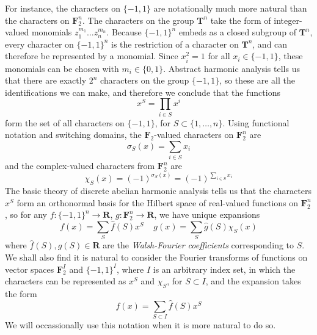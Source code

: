 For instance, the characters on $\{ -1, 1 \}$ are notationally much more natural than the characters on $\mathbf{F}_2^n$. The characters on the group $\mathbf{T}^n$ take the form of integer-valued monomials $z_1^{m_1} \dots z_n^{m_n}$. Because $\{ -1, 1 \}^n$ embeds as a closed subgroup of $\mathbf{T}^n$, every character on $\{ -1, 1 \}^n$ is the restriction of a character on $\mathbf{T}^n$, and can therefore be represented by a monomial. Since $x_i^2 = 1$ for all $x_i \in \{ -1, 1 \}$, these monomials can be chosen with $m_i \in \{ 0, 1 \}$. Abstract harmonic analysis tells us that there are exactly $2^n$ characters on the group $\{ -1, 1 \}$, so these are all the identifications we can make, and therefore we conclude that the functions
%
\[ x^S = \prod_{i \in S} x^i \]
%
form the set of all characters on $\{ -1, 1 \}$, for $S \subset \{ 1, \dots, n \}$. Using functional notation and switching domains, the $\mathbf{F}_2$-valued characters on $\mathbf{F}_2^n$ are
%
\[ \sigma_S(x) = \sum_{i \in S} x_i \]
%
and the complex-valued characters from $\mathbf{F}_2^n$ are
%
\[ \chi_S(x) = (-1)^{\sigma_S(x)} = (-1)^{\sum_{i \in S} x_i} \]
%
The basic theory of discrete abelian harmonic analysis tells us that the characters $x^S$ form an orthonormal basis for the Hilbert space of real-valued functions on $\mathbf{F}_2^n$, so for any $f: \{ -1, 1 \}^n \to \mathbf{R}$, $g: \mathbf{F}_2^n \to \mathbf{R}$, we have unique expansions
%
\[ f(x) = \sum_S \widehat{f}(S) x^S\ \ \ \ \ g(x) = \sum_S \widehat{g}(S) \chi_S(x) \]
%
where $\widehat{f}(S), \widehat{g}(S) \in \mathbf{R}$ are the {\it Walsh-Fourier coefficients} corresponding to $S$. We shall also find it is natural to consider the Fourier transforms of functions on vector spaces $\mathbf{F}_2^I$ and $\{ -1, 1 \}^I$, where $I$ is an arbitrary index set, in which the characters can be represented as $x^S$ and $\chi_S$, for $S \subset I$, and the expansion takes the form
%
\[ f(x) = \sum_{S \subset I} \widehat{f}(S) x^S \]
%
We will occassionally use this notation when it is more natural to do so.

